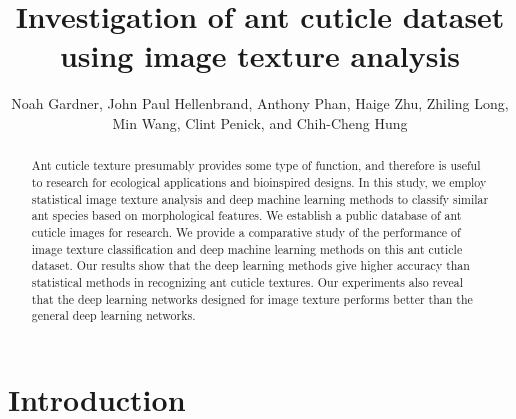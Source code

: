 \documentclass{aci}
\numberwithin{equation}{section}
\begin{document}
\title{Investigation of ant cuticle dataset using image texture
    analysis}

\author{%
    Noah Gardner,
    John Paul Hellenbrand,
    Anthony Phan,
    Haige Zhu,
    Zhiling Long, \\
    Min Wang,
    Clint Penick,
    and Chih-Cheng Hung\corrauth
}%


\address{%
}


\begin{abstract}
    Ant cuticle texture presumably provides some type of function, and therefore
    is useful to research for ecological applications and bioinspired designs.
    In this study, we employ statistical image texture analysis and deep machine
    learning methods to classify similar ant species based on morphological
    features. We establish a public database of ant cuticle images for research.
    We provide a comparative study of the performance of image texture
    classification and deep machine learning methods on this ant cuticle dataset.
    Our results show that the deep learning methods give higher accuracy than
    statistical methods in recognizing ant cuticle textures. Our experiments
    also reveal that the deep learning networks designed for image texture
    performs better than the general deep learning networks.
\end{abstract}
\maketitle

\section{Introduction}
\end{document}
